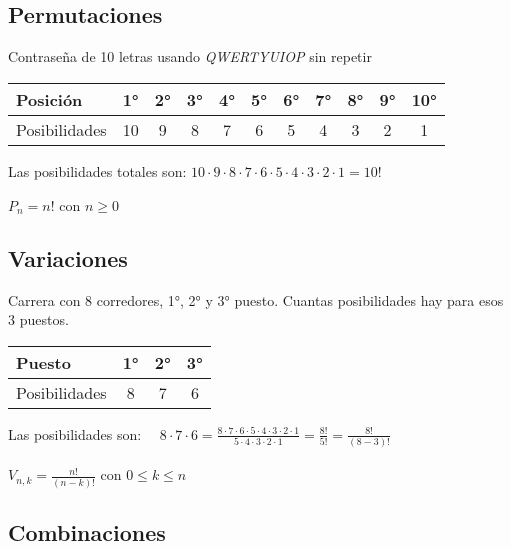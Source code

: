 \documentclass[a4paper,10pt]{article}
\begin{document}
\subsection{Permutaciones}

\ejemplo Contraseña de 10 letras usando \textit{QWERTYUIOP} sin repetir \\ 

\begin{center}
  \begin{tabular}[t]{ | l | c | c | c | c | c | c | c | c | c | c | }
    \hline
    Posición & 1° & 2° & 3° & 4° & 5° & 6° & 7° & 8° & 9° & 10° \\
    \hline Posibilidades & 10 & 9 & 8 & 7 & 6 & 5 & 4 & 3 & 2 & 1 \\
    \hline
  \end{tabular}
\end{center}

Las posibilidades totales son: $10 \cdot 9 \cdot 8 \cdot 7 \cdot 6 \cdot 5 \cdot 4 \cdot 3 \cdot 2 \cdot 1 = 10!$ \\ \\

$P_n = n! \mbox{ con } n \geq 0$


\subsection{Variaciones}


\ejemplo Carrera con 8 corredores, 1°, 2° y 3° puesto. Cuantas posibilidades hay para esos 3 puestos.

\begin{center}
  \begin{tabular}[t]{ | l | c | c | c | }
    \hline
    Puesto & 1° & 2° & 3° \\
    \hline Posibilidades & 8 & 7 & 6 \\
    \hline
  \end{tabular}
\end{center}

Las posibilidades son: \ \ $8 \cdot 7 \cdot 6 = \frac{8 \cdot 7 \cdot 6 \cdot 5 \cdot 4 \cdot 3 \cdot 2 \cdot 1}{5 \cdot 4 \cdot 3 \cdot 2 \cdot 1} = \frac{8!}{5!} = \frac{8!}{(8-3)!}$  \\ \\

$V_{n,k} = \frac {n!} {(n-k)!} \mbox{ con } 0 \leq k \leq n$


\subsection{Combinaciones}
\end{document}
